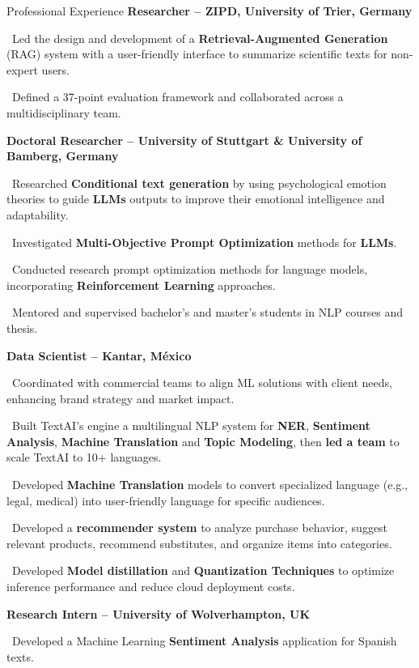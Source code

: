 \begin{rubric}{Professional Experience}
    \entry*[02.2025 -- Present] \textbf{Researcher -- ZIPD, University of Trier, Germany}

    	\textbullet~Led the design and development of a \textbf{Retrieval-Augmented Generation} (RAG) system with a user-friendly interface to summarize scientific texts for non-expert users.\par

    	\textbullet~Defined a 37-point evaluation framework and collaborated across a multidisciplinary team.\par\par

    \entry*[04.2022 -- 01.2025] \textbf{Doctoral Researcher -- University of Stuttgart \& University of Bamberg, Germany}

    	\textbullet~Researched \textbf{Conditional text generation} by using psychological emotion theories to guide \textbf{LLMs} outputs to improve their emotional intelligence and adaptability.\par

    	\textbullet~Investigated \textbf{Multi-Objective Prompt Optimization} methods for \textbf{LLMs}.\par

    	\textbullet~Conducted research prompt optimization methods for language models, incorporating \textbf{Reinforcement Learning} approaches.\par

    	\textbullet~Mentored and supervised bachelor’s and master’s students in NLP courses and thesis.\par

    \entry*[06.2018 -- 09.2021] \textbf{Data Scientist -- Kantar, México}

    	\textbullet~Coordinated with commercial teams to align ML solutions with client needs, enhancing brand strategy and market impact.\par
%
    	\textbullet~Built TextAI’s engine a multilingual NLP system for \textbf{NER}, \textbf{Sentiment Analysis}, \textbf{Machine Translation} and \textbf{Topic Modeling}, then \textbf{led a team} to scale TextAI to 10+ languages.\par

    	\textbullet~Developed \textbf{Machine Translation} models to convert specialized language (e.g., legal, medical) into user-friendly language for specific audiences.

    	\textbullet~Developed a \textbf{recommender system} to analyze purchase behavior, suggest relevant products, recommend substitutes, and organize items into categories.\par

    	\textbullet~Developed \textbf{Model distillation} and \textbf{Quantization Techniques} to optimize inference performance and reduce cloud deployment costs.

%
%
    \entry*[02.2017 -- 08.2017] \textbf{Research Intern -- University of Wolverhampton, UK}

    \textbullet~Developed a Machine Learning \textbf{Sentiment Analysis} application for Spanish texts.
%
\end{rubric}
